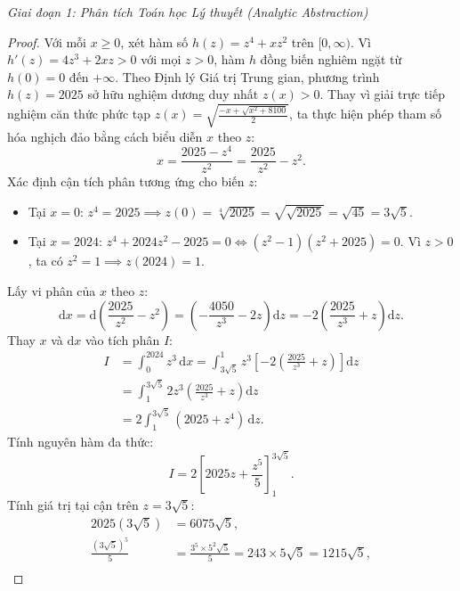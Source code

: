 \documentclass{article}
\begin{document}
\vspace{0.5em}\noindent\emph{Giai đoạn 1: Phân tích Toán học Lý thuyết (Analytic Abstraction)}

\begin{proof}
Với mỗi $x \ge 0$, xét hàm số $h(z) = z^4 + x z^2$ trên $[0, \infty)$. Vì $h'(z) = 4z^3 + 2xz > 0$ với mọi $z > 0$, hàm $h$ đồng biến nghiêm ngặt từ $h(0) = 0$ đến $+\infty$. Theo Định lý Giá trị Trung gian, phương trình $h(z) = 2025$ sở hữu nghiệm dương duy nhất $z(x) > 0$.
Thay vì giải trực tiếp nghiệm căn thức phức tạp $z(x) = \sqrt{\frac{-x + \sqrt{x^2 + 8100}}{2}}$, ta thực hiện phép tham số hóa nghịch đảo bằng cách biểu diễn $x$ theo $z$:
\begin{equation}
    x = \frac{2025 - z^4}{z^2} = \frac{2025}{z^2} - z^2.
\end{equation}
Xác định cận tích phân tương ứng cho biến $z$:
\begin{itemize}
    \item Tại $x = 0$: $z^4 = 2025 \implies z(0) = \sqrt[4]{2025} = \sqrt{\sqrt{2025}} = \sqrt{45} = 3\sqrt{5}$.
    \item Tại $x = 2024$: $z^4 + 2024z^2 - 2025 = 0 \iff (z^2 - 1)(z^2 + 2025) = 0$. Vì $z > 0$, ta có $z^2 = 1 \implies z(2024) = 1$.
\end{itemize}
Lấy vi phân của $x$ theo $z$:
\begin{equation}
    \mathrm{d}x = \mathrm{d}\left(\frac{2025}{z^2} - z^2\right) = \left(-\frac{4050}{z^3} - 2z\right) \mathrm{d}z = -2\left(\frac{2025}{z^3} + z\right) \mathrm{d}z.
\end{equation}
Thay $x$ và $\mathrm{d}x$ vào tích phân $I$:
\begin{align}
    I &= \int_0^{2024} z^3 \, \mathrm{d}x = \int_{3\sqrt{5}}^1 z^3 \left[ -2\left(\frac{2025}{z^3} + z\right) \right] \mathrm{d}z \nonumber \\
    &= \int_1^{3\sqrt{5}} 2z^3 \left(\frac{2025}{z^3} + z\right) \mathrm{d}z \nonumber \\
    &= 2 \int_1^{3\sqrt{5}} (2025 + z^4) \, \mathrm{d}z.
\end{align}
Tính nguyên hàm đa thức:
\begin{equation}
    I = 2 \left[ 2025 z + \frac{z^5}{5} \right]_1^{3\sqrt{5}}.
\end{equation}
Tính giá trị tại cận trên $z = 3\sqrt{5}$:
\begin{align}
    2025(3\sqrt{5}) &= 6075\sqrt{5}, \\
    \frac{(3\sqrt{5})^5}{5} &= \frac{3^5 \times 5^2 \sqrt{5}}{5} = 243 \times 5\sqrt{5} = 1215\sqrt{5}, \\

\end{align}
\end{proof}
\end{document}

